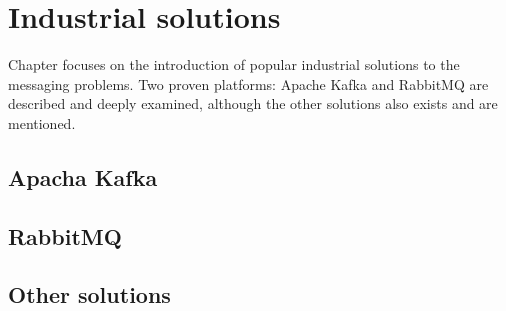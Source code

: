 \chapter{Industrial solutions}
\label{cha:industrialSolutions}

Chapter focuses on the introduction of popular industrial solutions to the messaging problems. Two proven platforms: Apache Kafka and RabbitMQ are described and deeply examined, although the other solutions also exists and are mentioned. 

\section{Apacha Kafka}
\label{sec:strukturaDokumentu}


\section{RabbitMQ}
\label{sec:strukturaDokumentu}


\section{Other solutions}
\label{sec:strukturaDokumentu}

